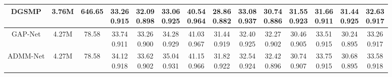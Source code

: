 \documentclass{article}
\begin{document}
\begin{table*}[t]
{\begin{tabular}{cccccccccccccc}
			\midrule
			DGSMP \cite{gsm}
			& 3.76M
			& 646.65
			&\tabincell{c}{33.26\\0.915}
			&\tabincell{c}{32.09\\0.898}
			&\tabincell{c}{33.06\\0.925}
			&\tabincell{c}{40.54\\0.964}
			&\tabincell{c}{28.86\\0.882}
			&\tabincell{c}{33.08\\0.937}
			&\tabincell{c}{30.74\\0.886}
			&\tabincell{c}{31.55\\0.923}
			&\tabincell{c}{31.66\\0.911}
			&\tabincell{c}{31.44\\0.925}
			&\tabincell{c}{32.63\\0.917}
			\\
			\midrule
			GAP-Net \cite{gapnet}
			& 4.27M
			& 78.58
			&\tabincell{c}{33.74\\0.911}
			&\tabincell{c}{33.26\\0.900}
			&\tabincell{c}{34.28\\0.929}
			&\tabincell{c}{41.03\\0.967}
			&\tabincell{c}{31.44\\0.919}
			&\tabincell{c}{32.40\\0.925}
			&\tabincell{c}{32.27\\0.902}
			&\tabincell{c}{30.46\\0.905}
			&\tabincell{c}{33.51\\0.915}
			&\tabincell{c}{30.24\\0.895}
			&\tabincell{c}{33.26\\0.917}
			\\
			\midrule
			ADMM-Net \cite{admm-net}
			& 4.27M
			& 78.58
			&\tabincell{c}{34.12\\0.918}
			&\tabincell{c}{33.62\\0.902}
			&\tabincell{c}{35.04\\0.931}
			&\tabincell{c}{41.15\\0.966}
			&\tabincell{c}{31.82\\0.922}
			&\tabincell{c}{32.54\\0.924}
			&\tabincell{c}{32.42\\0.896}
			&\tabincell{c}{30.74\\0.907}
			&\tabincell{c}{33.75\\0.915}
			&\tabincell{c}{30.68\\0.895}
			&\tabincell{c}{33.58\\0.918}

\end{tabular}}
\end{table*}
\end{document}
